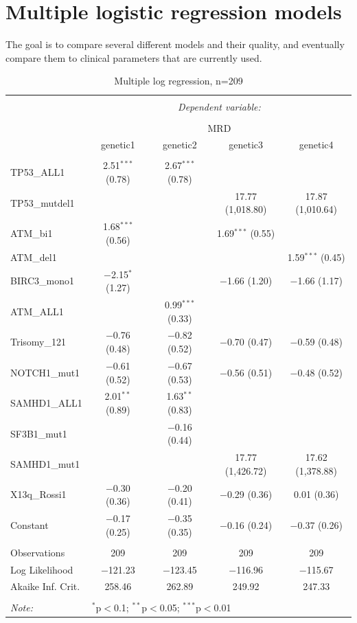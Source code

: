 \documentclass[a4paper,11pt]{article}
\begin{document}
\section*{Multiple logistic regression models}

The goal is to compare several different models and their quality, and eventually compare them to clinical parameters that are currently used.


\begin{table}[!htbp] \centering 
  \caption{Multiple log regression, n=209} 
  \label{} 
\tiny 
\begin{tabular}{@{\extracolsep{5pt}}lcccc} 
\\[-1.8ex]\hline 
\hline \\[-1.8ex] 
 & \multicolumn{4}{c}{\textit{Dependent variable:}} \\ 
\cline{2-5} 
\\[-1.8ex] & \multicolumn{4}{c}{MRD} \\ 
 & genetic1 & genetic2 & genetic3 & genetic4 \\ 
\hline \\[-1.8ex] 
 TP53\_ALL1 & 2.51$^{***}$ (0.78) & 2.67$^{***}$ (0.78) &  &  \\ 
  TP53\_mutdel1 &  &  & 17.77 (1,018.80) & 17.87 (1,010.64) \\ 
  ATM\_bi1 & 1.68$^{***}$ (0.56) &  & 1.69$^{***}$ (0.55) &  \\ 
  ATM\_del1 &  &  &  & 1.59$^{***}$ (0.45) \\ 
  BIRC3\_mono1 & $-$2.15$^{*}$ (1.27) &  & $-$1.66 (1.20) & $-$1.66 (1.17) \\ 
  ATM\_ALL1 &  & 0.99$^{***}$ (0.33) &  &  \\ 
  Trisomy\_121 & $-$0.76 (0.48) & $-$0.82 (0.52) & $-$0.70 (0.47) & $-$0.59 (0.48) \\ 
  NOTCH1\_mut1 & $-$0.61 (0.52) & $-$0.67 (0.53) & $-$0.56 (0.51) & $-$0.48 (0.52) \\ 
  SAMHD1\_ALL1 & 2.01$^{**}$ (0.89) & 1.63$^{**}$ (0.83) &  &  \\ 
  SF3B1\_mut1 &  & $-$0.16 (0.44) &  &  \\ 
  SAMHD1\_mut1 &  &  & 17.77 (1,426.72) & 17.62 (1,378.88) \\ 
  X13q\_Rossi1 & $-$0.30 (0.36) & $-$0.20 (0.41) & $-$0.29 (0.36) & 0.01 (0.36) \\ 
  Constant & $-$0.17 (0.25) & $-$0.35 (0.35) & $-$0.16 (0.24) & $-$0.37 (0.26) \\ 
 \hline \\[-1.8ex] 
Observations & 209 & 209 & 209 & 209 \\ 
Log Likelihood & $-$121.23 & $-$123.45 & $-$116.96 & $-$115.67 \\ 
Akaike Inf. Crit. & 258.46 & 262.89 & 249.92 & 247.33 \\ 
\hline 
\hline \\[-1.8ex] 
\textit{Note:}  & \multicolumn{4}{l}{$^{*}$p$<$0.1; $^{**}$p$<$0.05; $^{***}$p$<$0.01} \\ 
\end{tabular} 
\end{table} 
\end{document}
